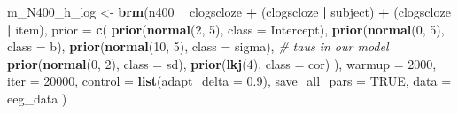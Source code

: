 \documentclass[12pt,ignorenonframetext,aspectratio=169]{beamer}
\newenvironment{Shaded}{\begin{snugshade}}{\end{snugshade}}
\newcommand{\CommentTok}[1]{\textcolor[rgb]{0.56,0.35,0.01}{\textit{#1}}}
\newcommand{\DataTypeTok}[1]{\textcolor[rgb]{0.13,0.29,0.53}{#1}}
\newcommand{\DecValTok}[1]{\textcolor[rgb]{0.00,0.00,0.81}{#1}}
\newcommand{\FloatTok}[1]{\textcolor[rgb]{0.00,0.00,0.81}{#1}}
\newcommand{\KeywordTok}[1]{\textcolor[rgb]{0.13,0.29,0.53}{\textbf{#1}}}
\newcommand{\NormalTok}[1]{#1}
\newcommand{\OperatorTok}[1]{\textcolor[rgb]{0.81,0.36,0.00}{\textbf{#1}}}
\newcommand{\OtherTok}[1]{\textcolor[rgb]{0.56,0.35,0.01}{#1}}
\newcommand{\StringTok}[1]{\textcolor[rgb]{0.31,0.60,0.02}{#1}}
\begin{document}
\begin{frame}[fragile]

\footnotesize

\begin{Shaded}
\begin{Highlighting}[]
\NormalTok{m_N400_h_log <-}\StringTok{ }\KeywordTok{brm}\NormalTok{(n400 }\OperatorTok{~}\StringTok{ }\NormalTok{clogscloze }\OperatorTok{+}
\StringTok{  }\NormalTok{(clogscloze }\OperatorTok{|}\StringTok{ }\NormalTok{subject) }\OperatorTok{+}
\StringTok{  }\NormalTok{(clogscloze }\OperatorTok{|}\StringTok{ }\NormalTok{item),}
\DataTypeTok{prior =}
  \KeywordTok{c}\NormalTok{(}
    \KeywordTok{prior}\NormalTok{(}\KeywordTok{normal}\NormalTok{(}\DecValTok{2}\NormalTok{, }\DecValTok{5}\NormalTok{), }\DataTypeTok{class =}\NormalTok{ Intercept),}
    \KeywordTok{prior}\NormalTok{(}\KeywordTok{normal}\NormalTok{(}\DecValTok{0}\NormalTok{, }\DecValTok{5}\NormalTok{), }\DataTypeTok{class =}\NormalTok{ b),}
    \KeywordTok{prior}\NormalTok{(}\KeywordTok{normal}\NormalTok{(}\DecValTok{10}\NormalTok{, }\DecValTok{5}\NormalTok{), }\DataTypeTok{class =}\NormalTok{ sigma),}
    \CommentTok{# taus in our model}
    \KeywordTok{prior}\NormalTok{(}\KeywordTok{normal}\NormalTok{(}\DecValTok{0}\NormalTok{, }\DecValTok{2}\NormalTok{), }\DataTypeTok{class =}\NormalTok{ sd),}
    \KeywordTok{prior}\NormalTok{(}\KeywordTok{lkj}\NormalTok{(}\DecValTok{4}\NormalTok{), }\DataTypeTok{class =}\NormalTok{ cor)}
\NormalTok{  ),}
\DataTypeTok{warmup =} \DecValTok{2000}\NormalTok{,}
\DataTypeTok{iter =} \DecValTok{20000}\NormalTok{,}
\DataTypeTok{control =} \KeywordTok{list}\NormalTok{(}\DataTypeTok{adapt_delta =} \FloatTok{0.9}\NormalTok{),}
\DataTypeTok{save_all_pars =} \OtherTok{TRUE}\NormalTok{,}
\DataTypeTok{data =}\NormalTok{ eeg_data}
\NormalTok{)}
\end{Highlighting}
\end{Shaded}

\end{frame}
\end{document}
